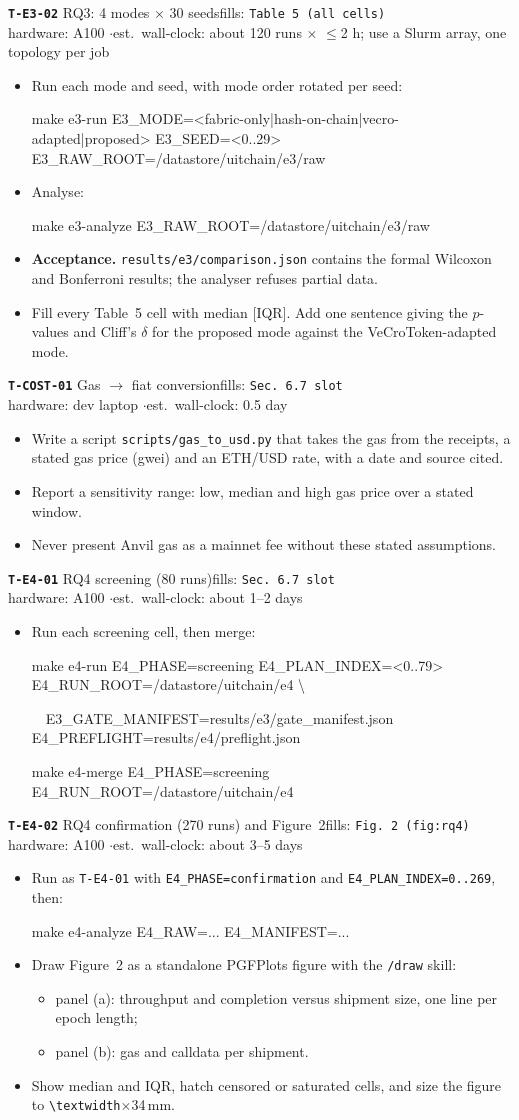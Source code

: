 \documentclass[10pt,a4paper]{article}
\newcommand{\task}[6]{%
\par\medskip\noindent\colorbox{blue!8}{\parbox{\dimexpr\linewidth-2\fboxsep}{%
\textbf{\texttt{#1}} \enspace #2\hfill{\small fills: \texttt{#3}}\\
{\small hardware: #4 \quad$\cdot$\quad est.\ wall-clock: #5}}}\par
\begin{itemize}#6\end{itemize}}
\newcommand{\cmd}[1]{\par\noindent\hspace*{1em}\begin{minipage}[t]{\dimexpr\linewidth-1em}\raggedright\small\ttfamily #1\end{minipage}\par}
\begin{document}
\task{T-E3-02}{RQ3: 4 modes $\times$ 30 seeds}{Table~5 (all cells)}{A100}{about 120 runs $\times$ $\le$2 h; use a Slurm array, one topology per job}{
\item Run each mode and seed, with mode order rotated per seed:
\cmd{make e3-run E3\_MODE=<fabric-only|hash-on-chain|vecro-adapted|proposed> E3\_SEED=<0..29> E3\_RAW\_ROOT=/datastore/uitchain/e3/raw}
\item Analyse:
\cmd{make e3-analyze E3\_RAW\_ROOT=/datastore/uitchain/e3/raw}
\item \textbf{Acceptance.} \texttt{results/e3/comparison.json} contains the formal Wilcoxon and Bonferroni results; the analyser refuses partial data.
\item Fill every Table~5 cell with median [IQR]. Add one sentence giving the $p$-values and Cliff's $\delta$ for the proposed mode against the VeCroToken-adapted mode.
}

\task{T-COST-01}{Gas $\rightarrow$ fiat conversion}{Sec.~6.7 slot}{dev laptop}{0.5 day}{
\item Write a script \texttt{scripts/gas\_to\_usd.py} that takes the gas from the receipts, a stated gas price (gwei) and an ETH/USD rate, with a date and source cited.
\item Report a sensitivity range: low, median and high gas price over a stated window.
\item Never present Anvil gas as a mainnet fee without these stated assumptions.
}

\task{T-E4-01}{RQ4 screening (80 runs)}{Sec.~6.7 slot}{A100}{about 1--2 days}{
\item Run each screening cell, then merge:
\cmd{make e4-run E4\_PHASE=screening E4\_PLAN\_INDEX=<0..79> E4\_RUN\_ROOT=/datastore/uitchain/e4 \textbackslash}
\cmd{\ \ E3\_GATE\_MANIFEST=results/e3/gate\_manifest.json E4\_PREFLIGHT=results/e4/preflight.json}
\cmd{make e4-merge E4\_PHASE=screening E4\_RUN\_ROOT=/datastore/uitchain/e4}
}

\task{T-E4-02}{RQ4 confirmation (270 runs) and Figure~2}{Fig.~2 (\texttt{fig:rq4})}{A100}{about 3--5 days}{
\item Run as \texttt{T-E4-01} with \texttt{E4\_PHASE=confirmation} and \texttt{E4\_PLAN\_INDEX=0..269}, then:
\cmd{make e4-analyze E4\_RAW=... E4\_MANIFEST=...}
\item Draw Figure~2 as a standalone PGFPlots figure with the \texttt{/draw} skill:
  \begin{itemize}
  \item panel (a): throughput and completion versus shipment size, one line per epoch length;
  \item panel (b): gas and calldata per shipment.
  \end{itemize}
\item Show median and IQR, hatch censored or saturated cells, and size the figure to \texttt{\textbackslash textwidth}$\times$34\,mm.
}
\end{document}

